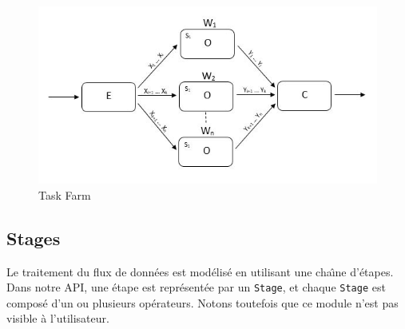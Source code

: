 \begin{figure}[ht]
\centering
     \includegraphics[width=1.0\textwidth]{Figures/ParallelismeTaskFarm.jpg}
      \caption{Task Farm}
       \label{ParallelismeTaskFarm.fig}
\end{figure}








\subsection{Stages}

Le traitement du flux de donn\'ees est mod\'elis\'e en utilisant une cha\^{\i}ne d'\'etapes. Dans notre API, une \'etape est repr\'esent\'ee par un \texttt{Stage}, et chaque \texttt{Stage} est compos\'e d'un ou plusieurs op\'erateurs. Notons toutefois que ce module n'est pas visible \`a l'utilisateur. 


